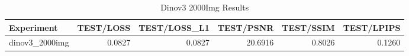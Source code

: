 \begin{table}[htbp]
\centering
\caption{Dinov3 2000Img Results}
\label{tab:dinov3_2000img_results}
\begin{tabular}{lrrrrr}
\toprule
Experiment & TEST/LOSS & TEST/LOSS_L1 & TEST/PSNR & TEST/SSIM & TEST/LPIPS \\
\midrule
dinov3_2000img & 0.0827 & 0.0827 & 20.6916 & 0.8026 & 0.1260 \\
\bottomrule
\end{tabular}
\end{table}
